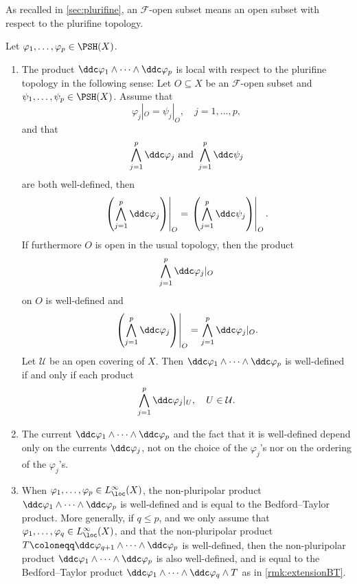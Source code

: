 As recalled in \cref{sec:plurifine}, an $\mathcal{F}$-open subset means an open subset with respect to the plurifine topology.
\begin{proposition} \label{prop:npp1}
Let $\varphi_1,\ldots,\varphi_p\in \PSH(X)$.
\begin{enumerate}
\item\label{itm:prop:npp1:1} The product $\ddc \varphi_1\wedge\cdots\wedge \ddc \varphi_p$ is local with respect to the plurifine topology in the following sense: Let $O\subseteq X$ be an $\mathcal{F}$-open subset and $\psi_1,\ldots,\psi_p\in \PSH(X)$. Assume that
\[
\varphi_j|_{O}=\psi_j|_{O},\quad j=1,\ldots,p,
\]
and that
\[
\bigwedge_{j=1}^p \ddc \varphi_j\textup{ and } \bigwedge_{j=1}^p \ddc \psi_j
\]
are both well-defined, then
    \begin{equation}\label{eq:ppp1}
    \left.\left(\bigwedge_{j=1}^p \ddc \varphi_j\right)\right|_{O}=\left.\left(\bigwedge_{j=1}^p \ddc \psi_j\right)\right|_{O}.
    \end{equation}
If furthermore $O$ is open in the usual topology, then the product
\[
\bigwedge_{j=1}^p \ddc \varphi_j|_{O}
\]
on $O$ is well-defined and
\begin{equation}\label{eq:ppp2}
\left. \left(\bigwedge_{j=1}^p \ddc \varphi_j\right)\right|_{O}=\bigwedge_{j=1}^p \ddc \varphi_j|_{O}.
\end{equation}
Let $\mathcal{U}$ be an open covering of $X$. Then $\ddc \varphi_1\wedge\cdots\wedge \ddc \varphi_p$
is well-defined if and only if each product
\[
\bigwedge_{j=1}^p \ddc \varphi_j|_{U},\quad U\in \mathcal{U}.
\]
    \item\label{itm:prop:npp1:2} The current $\ddc \varphi_1\wedge\cdots\wedge \ddc \varphi_p$ and the fact that it is well-defined depend only on the currents $\ddc \varphi_j$, not on the choice of the $\varphi_j$'s nor on the ordering of the $\varphi_j$'s.
    \item\label{itm:prop:npp1:3} When $\varphi_1,\ldots,\varphi_p\in L^{\infty}_{\loc}(X)$, the non-pluripolar product $\ddc \varphi_1\wedge\cdots\wedge \ddc \varphi_p$ is well-defined and is equal to the Bedford--Taylor product. More generally, if $q\leq p$, and we only assume that $\varphi_1,\ldots,\varphi_q\in L^{\infty}_{\loc}(X)$, and that the non-pluripolar product $T\coloneqq \ddc \varphi_{q+1}\wedge \cdots \wedge \ddc \varphi_p$ is well-defined, then the non-pluripolar product $\ddc \varphi_1\wedge\cdots\wedge \ddc \varphi_p$ is also well-defined, and is equal to the Bedford--Taylor product $\ddc \varphi_1\wedge\cdots\wedge \ddc \varphi_q\wedge T$ as in \cref{rmk:extensionBT}.

\end{enumerate}
\end{proposition}
